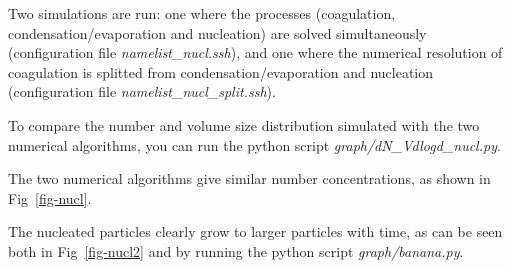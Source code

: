 \documentclass[a4paper,11pt]{article}
\begin{document}
Two simulations are run: one where the processes (coagulation,
condensation/evaporation and nucleation) are solved simultaneously
(configuration file {\it{namelist\_nucl.ssh}}), and one where the numerical
resolution of coagulation is splitted from condensation/evaporation and
nucleation (configuration file {\it{namelist\_nucl\_split.ssh}}). 

To compare the number and volume size distribution simulated with the two numerical algorithms, you can run the python script {\it{graph/dN\_Vdlogd\_nucl.py}}.

The two numerical algorithms give similar number concentrations, as shown in Fig~\ref{fig-nucl}.

The nucleated particles clearly grow to larger particles with time, as can be seen both in Fig~\ref{fig-nucl2} and by running the python script {\it{graph/banana.py}}.
\end{document}
